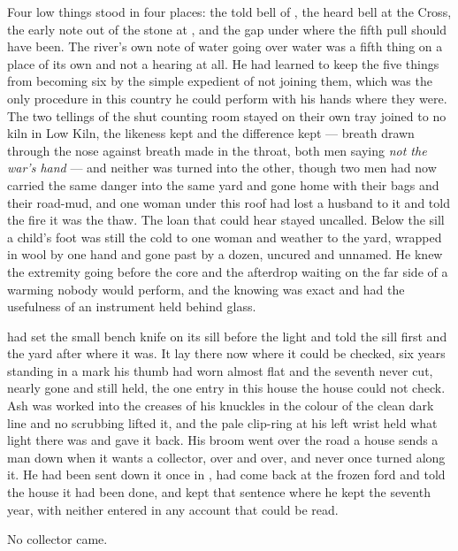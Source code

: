 Four low things stood in four places: the told bell of , the heard bell at the Cross, the early note out of the stone at , and the gap under  where the fifth pull should have been. The river's own note of water going over water was a fifth thing on a place of its own and not a hearing at all. He had learned to keep the five things from becoming six by the simple expedient of not joining them, which was the only procedure in this country he could perform with his hands where they were. The two tellings of the shut counting room stayed on their own tray joined to no kiln in Low Kiln, the likeness kept and the difference kept — breath drawn through the nose against breath made in the throat, both men saying \emph{not the war's hand} — and neither was turned into the other, though two men had now carried the same danger into the same yard and gone home with their bags and their road-mud, and one woman under this roof had lost a husband to it and told the fire it was the thaw. The loan that could hear stayed uncalled. Below the sill a child's foot was still the cold to one woman and weather to the yard, wrapped in wool by one hand and gone past by a dozen, uncured and unnamed. He knew the extremity going before the core and the afterdrop waiting on the far side of a warming nobody would perform, and the knowing was exact and had the usefulness of an instrument held behind glass.

\scenebreak

 had set the small bench knife on its sill before the light and told the sill first and the yard after where it was. It lay there now where it could be checked, six years standing in a mark his thumb had worn almost flat and the seventh never cut, nearly gone and still held, the one entry in this house the house could not check. Ash was worked into the creases of his knuckles in the colour of the clean dark line and no scrubbing lifted it, and the pale clip-ring at his left wrist held what light there was and gave it back. His broom went over the road a house sends a man down when it wants a collector, over and over, and never once turned along it. He had been sent down it once in , had come back at the frozen ford and told the house it had been done, and kept that sentence where he kept the seventh year, with neither entered in any account that could be read.

No collector came.

